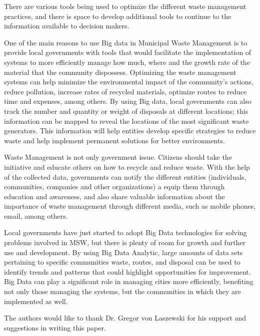 \documentclass[sigconf]{acmart}
\begin{document}
There are various tools being used to optimize the different waste management practices, and there is space to develop additional tools to continue to the information available to decision makers.

One of the main reasons to use Big data in Municipal Waste Management is to provide local governments with tools that would facilitate the implementation of systems to more efficiently manage how much, where and the growth rate of the material that the community dispossess. Optimizing the waste management systems can help minimize the environmental impact of the community's actions, reduce pollution, increase rates of recycled materials, optimize routes to reduce time and expenses, among others.
By using Big data, local governments can also track the number and quantity or weight of disposals at different locations; this information can be mapped to reveal the locations of the most significant waste generators.  This information will help entities develop specific strategies to reduce waste and help implement permanent solutions for better environments. 

Waste Management is not only government issue. Citizens should take the initiative and educate others on how to recycle and reduce waste. With the help of the collected data, governments can notify the different entities (individuals, communities, companies and other organizations) a equip them through education and awareness, and also share valuable information about the importance of waste management through different media, such as mobile phones, email, among others.

Local governments have just started to adopt Big Data technologies for solving problems involved in MSW, but there is plenty of room for growth and further use and development.  By using Big Data Analytic, large amounts of data sets pertaining to specific communities waste, routes, and disposal can be used to identify trends and patterns that could highlight opportunities for improvement. Big Data can play a significant role in managing cities more efficiently, benefiting not only those managing the systems, but the communities in which they are implemented as well.
\begin{acks}

The authors would like to thank Dr. Gregor von Laszewski for his support and suggestions in writing this paper.

\end{acks}

 
\end{document}
